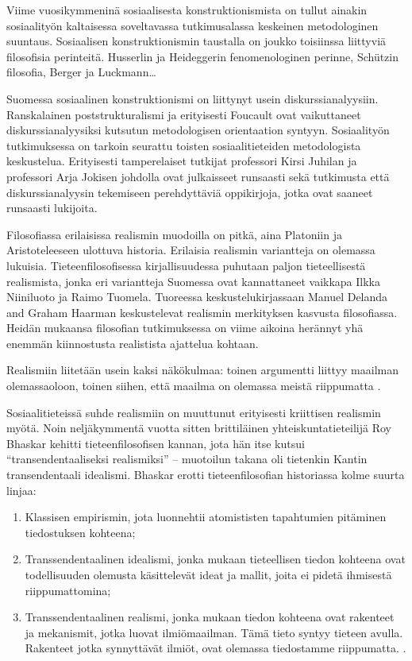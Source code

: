 \documentclass[a4paper,11pt,finnish]{article}
\begin{document}
Viime vuosikymmeninä sosiaalisesta konstruktionismista on tullut ainakin
sosiaalityön kaltaisessa soveltavassa tutkimusalassa keskeinen
metodologinen suuntaus. Sosiaalisen konstruktionismin taustalla on
joukko toisiinssa liittyviä filosofisia perinteitä. Husserlin ja
Heideggerin fenomenologinen perinne, Schützin filosofia, Berger ja
Luckmann\ldots{}

Suomessa sosiaalinen konstruktionismi on liittynyt usein
diskurssianalyysiin. Ranskalainen poststrukturalismi ja erityisesti
Foucault ovat vaikuttaneet diskurssianalyysiksi kutsutun metodologisen
orientaation syntyyn. Sosiaalityön tutkimuksessa on tarkoin seurattu
toisten sosiaalitieteiden metodologista keskustelua. Erityisesti
tamperelaiset tutkijat professori Kirsi Juhilan ja professori Arja
Jokisen johdolla ovat julkaisseet runsaasti sekä tutkimusta että
diskurssianalyysin tekemiseen perehdyttäviä oppikirjoja, jotka ovat
saaneet runsaasti lukijoita.

Filosofiassa erilaisissa realismin muodoilla on pitkä, aina Platoniin ja
Aristoteleeseen ulottuva historia. Erilaisia realismin variantteja on
olemassa lukuisia. Tieteenfilosofisessa kirjallisuudessa puhutaan paljon
tieteellisestä realismista, jonka eri variantteja Suomessa ovat
kannattaneet vaikkapa Ilkka Niiniluoto ja Raimo Tuomela. Tuoreessa
keskustelukirjassaan Manuel Delanda and Graham Haarman
\citep{Delanda_Harman_2017} keskustelevat realismin merkityksen kasvusta
filosofiassa. Heidän mukaansa filosofian tutkimuksessa on viime aikoina
herännyt yhä enemmän kiinnostusta realistista ajattelua kohtaan.

Realismiin liitetään usein kaksi näkökulmaa: toinen argumentti liittyy
maailman olemassaoloon, toinen siihen, että maailma on olemassa meistä
riippumatta \cite{sep-realism}.

Sosiaalitieteissä suhde realismiin on muuttunut erityisesti kriittisen
realismin myötä. Noin neljäkymmentä vuotta sitten brittiläinen
yhteiskuntatieteilijä Roy Bhaskar kehitti tieteenfilosofisen kannan,
jota hän itse kutsui ``transendentaaliseksi realismiksi'' -- muotoilun
takana oli tietenkin Kantin transendentaali idealismi. Bhaskar erotti
tieteenfilosofian historiassa kolme suurta linjaa:

\begin{enumerate}
\def\labelenumi{\arabic{enumi}.}

\item
  Klassisen empirismin, jota luonnehtii atomististen tapahtumien
  pitäminen tiedostuksen kohteena;
\item
  Transsendentaalinen idealismi, jonka mukaan tieteellisen tiedon
  kohteena ovat todellisuuden olemusta käsittelevät ideat ja mallit,
  joita ei pidetä ihmisestä riippumattomina;
\item
  Transsendentaalinen realismi, jonka mukaan tiedon kohteena ovat
  rakenteet ja mekanismit, jotka luovat ilmiömaailman. Tämä tieto syntyy
  tieteen avulla. Rakenteet jotka synnyttävät ilmiöt, ovat olemassa
  tiedostamme riippumatta. \citep[][277]{Mantysaari_1991}.
\end{enumerate}
\end{document}
